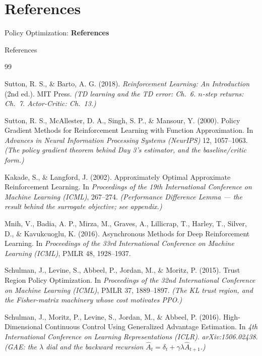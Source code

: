 \section{References}
\begin{frame}{}
    \LARGE Policy Optimization: \textbf{References}
\end{frame}

\begin{frame}[allowframebreaks]{References}
\begin{thebibliography}{99}

Sutton, R. S., \& Barto, A. G. (2018).
\newblock \emph{Reinforcement Learning: An Introduction} (2nd ed.). MIT Press.
\newblock \textit{(TD learning and the TD error: Ch.\ 6. $n$-step returns: Ch.\ 7. Actor-Critic: Ch.\ 13.)}

Sutton, R. S., McAllester, D. A., Singh, S. P., \& Mansour, Y. (2000).
\newblock Policy Gradient Methods for Reinforcement Learning with Function Approximation.
\newblock In \emph{Advances in Neural Information Processing Systems (NeurIPS)} 12, 1057--1063.
\newblock \textit{(The policy gradient theorem behind Day 3's estimator, and the baseline/critic form.)}

Kakade, S., \& Langford, J. (2002).
\newblock Approximately Optimal Approximate Reinforcement Learning.
\newblock In \emph{Proceedings of the 19th International Conference on Machine Learning (ICML)}, 267--274.
\newblock \textit{(Performance Difference Lemma --- the result behind the surrogate objective; see appendix.)}

Mnih, V., Badia, A. P., Mirza, M., Graves, A., Lillicrap, T., Harley, T., Silver, D., \& Kavukcuoglu, K. (2016).
\newblock Asynchronous Methods for Deep Reinforcement Learning.
\newblock In \emph{Proceedings of the 33rd International Conference on Machine Learning (ICML)}, PMLR 48, 1928--1937.

Schulman, J., Levine, S., Abbeel, P., Jordan, M., \& Moritz, P. (2015).
\newblock Trust Region Policy Optimization.
\newblock In \emph{Proceedings of the 32nd International Conference on Machine Learning (ICML)}, PMLR 37, 1889--1897.
\newblock \textit{(The KL trust region, and the Fisher-matrix machinery whose cost motivates PPO.)}

Schulman, J., Moritz, P., Levine, S., Jordan, M., \& Abbeel, P. (2016).
\newblock High-Dimensional Continuous Control Using Generalized Advantage Estimation.
\newblock In \emph{4th International Conference on Learning Representations (ICLR)}. \emph{arXiv:1506.02438}.
\newblock \textit{(GAE: the $\lambda$ dial and the backward recursion $\hat{A}_t = \delta_t + \gamma\lambda\hat{A}_{t+1}$.)}


\end{thebibliography}
\end{frame}
